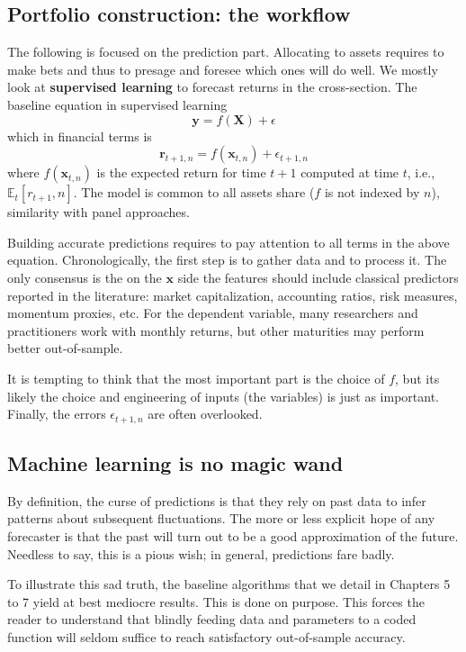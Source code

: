\subsection{Portfolio construction: the workflow}
The following is focused on the prediction part. Allocating to assets requires to make bets and thus to presage and foresee which ones will do well. We mostly look at \textbf{supervised learning} to forecast returns in the cross-section. The baseline equation in supervised learning
\begin{equation}
    \mathbf{y} = f(\mathbf{X}) + \epsilon 
\end{equation}
which in financial terms is
\begin{equation}
    \mathbf{r}_{t+1,n} = f(\mathbf{x}_{t,n}) + \epsilon_{t+1,n}
\end{equation}
where $f(\mathbf{x}_{t,n})$ is the expected return for time $t+1$ computed at time $t$, i.e., $\mathbb{E}_{t}[r_{t+1},n]$. The model is common to all assets share ($f$ is not indexed by $n$), similarity with panel approaches.

Building accurate predictions requires to pay attention to all terms in the above equation. Chronologically, the first step is to gather data and to process it. The only consensus is the on the $\mathbf{x}$ side the features should include classical predictors reported in the literature: market capitalization, accounting ratios, risk measures, momentum proxies, etc. For the dependent variable, many researchers and practitioners work with monthly returns, but other maturities may perform better out-of-sample.

It is tempting to think that the most important part is the choice of $f$, but its likely the choice and engineering of inputs (the variables) is just as important. Finally, the errors $\epsilon_{t+1,n}$ are often overlooked. 

\subsection{Machine learning is no magic wand}
By definition, the curse of predictions is that they rely on past data to infer patterns about subsequent fluctuations. The more or less explicit hope of any forecaster is that the past will turn out to be a good approximation of the future. Needless to say, this is a pious wish; in general, predictions fare badly.

To illustrate this sad truth, the baseline algorithms that we detail in Chapters 5 to 7 yield at best mediocre results. This is done on purpose. This forces the reader to understand that blindly feeding data and parameters to a coded function will seldom suffice to reach satisfactory out-of-sample accuracy.

